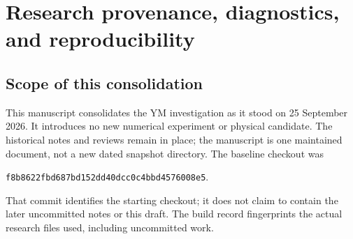 \section{Research provenance, diagnostics, and reproducibility}\label{app:provenance}
\subsection{Scope of this consolidation}
This manuscript consolidates the YM investigation as it
stood on 25 September 2026. It introduces no new numerical
experiment or physical candidate. The historical notes
and reviews remain in place; the manuscript is one
maintained document, not a new dated snapshot directory.
The baseline checkout was
\begin{center}\small
\texttt{f8b8622fbd687bd152dd40dcc0c4bbd4576008e5}.
\end{center}
That commit identifies the starting checkout; it does not
claim to contain the later uncommitted notes or this draft.
The build record fingerprints the actual research files
used, including uncommitted work.

